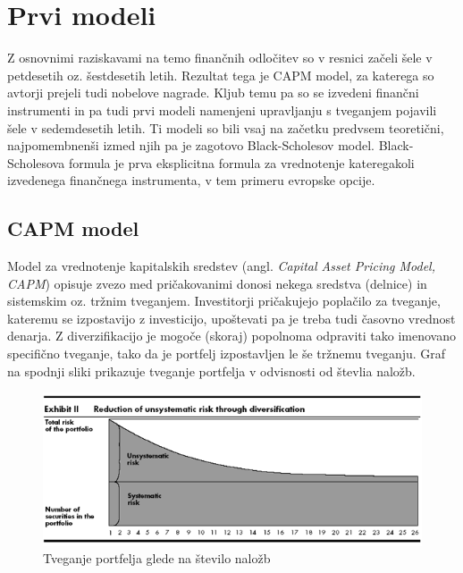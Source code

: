 \documentclass[12pt,a4paper]{amsart}
\theoremstyle{definition} %
\theoremstyle{plain} %
\begin{document}
\section{Prvi modeli}
Z osnovnimi raziskavami na temo finančnih odločitev so v resnici začeli šele v petdesetih oz.
šestdesetih letih. Rezultat tega je CAPM model, za katerega so avtorji prejeli tudi nobelove 
nagrade. Kljub temu pa so se izvedeni finančni instrumenti in pa tudi prvi modeli namenjeni 
upravljanju s tveganjem pojavili šele v sedemdesetih letih. Ti modeli so bili vsaj na začetku
predvsem teoretični, najpomembnenši izmed njih pa je zagotovo Black-Scholesov model. 
Black-Scholesova formula je prva eksplicitna formula za vrednotenje kateregakoli izvedenega
finančnega instrumenta, v tem primeru evropske opcije.

\subsection{CAPM model}
Model za vrednotenje kapitalskih sredstev (angl. \textit{Capital Asset Pricing Model, CAPM}) 
opisuje zvezo med pričakovanimi donosi nekega sredstva (delnice) in sistemskim oz. tržnim tveganjem. 
Investitorji pričakujejo poplačilo za tveganje, kateremu se izpostavijo z investicijo, upoštevati
pa je treba tudi časovno vrednost denarja. Z diverzifikacijo je mogoče (skoraj) popolnoma 
odpraviti tako imenovano specifično tveganje, tako da je portfelj izpostavljen le še tržnemu 
tveganju. Graf na spodnji sliki prikazuje tveganje portfelja v odvisnosti od števlia naložb. 

\begin{figure}[h]
\includegraphics[scale=0.8]{systemic_risk.png}
\caption{Tveganje portfelja glede na število naložb}
\label{risk}
\end{figure}
\end{document}
